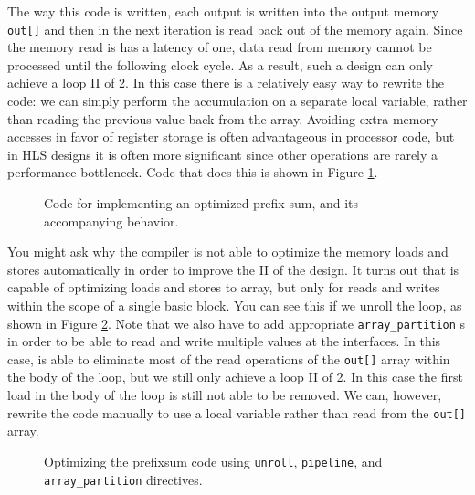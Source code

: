 The way this code is written, each output is written into the output memory \lstinline|out[]| and then in the next iteration is read back out of the memory again.  Since the memory read is has a latency of one, data read from memory cannot be processed until the following clock cycle.  As a result, such a design can only achieve a loop II of 2.  In this case there is a relatively easy way to rewrite the code: we can simply perform the accumulation on a separate local variable, rather than reading the previous value back from the array.  Avoiding extra memory accesses in favor of register storage is often advantageous in processor code, but in HLS designs it is often more significant since other operations are rarely a performance bottleneck.  Code that does this is shown in Figure \ref{fig:prefixsum_optimized}.

\begin{figure}
\begin{minipage}{.45\textwidth}
{\tiny }
\end{minipage}
\begin{minipage}{.45\textwidth}
\centering
{\tiny }
\end{minipage}
\caption{ Code for implementing an optimized prefix sum, and its accompanying behavior. }
\label{fig:prefixsum_optimized}
\end{figure}

You might ask why the compiler is not able to optimize the memory loads and stores automatically in order to improve the II of the design.  It turns out that \VHLS is capable of optimizing loads and stores to array, but only for reads and writes within the scope of a single basic block.  You can see this if we unroll the loop, as shown in Figure \ref{fig:prefixsum_unrolled}.  Note that we also have to add appropriate \lstinline{array_partition} s in order to be able to read and write multiple values at the interfaces.   In this case, \VHLS is able to eliminate most of the read operations of the \lstinline{out[]} array within the body of the loop, but we still only achieve a loop II of 2.  In this case the first load in the body of the loop is still not able to be removed.  We can, however, rewrite the code manually to use a local variable rather than read from the \lstinline{out[]} array.

\begin{figure}
\begin{minipage}{.45\textwidth}
{\tiny }
\end{minipage}
\begin{minipage}{.45\textwidth}
\raggedleft
{\tiny }
\end{minipage}
\caption{ Optimizing the prefixsum code using \lstinline{unroll}, \lstinline{pipeline}, and \lstinline{array_partition} directives. }
\label{fig:prefixsum_unrolled}
\end{figure}

